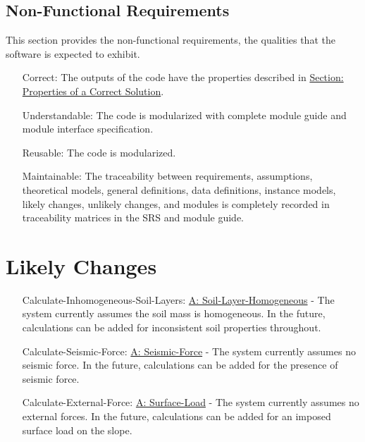 \documentclass[12pt]{article}
\begin{document}
\subsection{Non-Functional Requirements}
\label{Sec:NFRs}
This section provides the non-functional requirements, the qualities that the software is expected to exhibit.
\begin{itemize}
\item[Correct:\phantomsection\label{correct}]The outputs of the code have the properties described in \hyperref[Sec:CorSolProps]{Section: Properties of a Correct Solution}.
\item[Understandable:\phantomsection\label{understandable}]The code is modularized with complete module guide and module interface specification.
\item[Reusable:\phantomsection\label{reusable}]The code is modularized.
\item[Maintainable:\phantomsection\label{maintainable}]The traceability between requirements, assumptions, theoretical models, general definitions, data definitions, instance models, likely changes, unlikely changes, and modules is completely recorded in traceability matrices in the SRS and module guide.
\end{itemize}
\section{Likely Changes}
\label{Sec:LCs}
\begin{itemize}
\item[Calculate-Inhomogeneous-Soil-Layers:\phantomsection\label{LC_inhomogeneous}]\hyperref[assumpSLH]{A: Soil-Layer-Homogeneous} - The system currently assumes the soil mass is homogeneous. In the future, calculations can be added for inconsistent soil properties throughout.
\item[Calculate-Seismic-Force:\phantomsection\label{LC_seismic}]\hyperref[assumpSF]{A: Seismic-Force} - The system currently assumes no seismic force. In the future, calculations can be added for the presence of seismic force.
\item[Calculate-External-Force:\phantomsection\label{LC_external}]\hyperref[assumpSL]{A: Surface-Load} - The system currently assumes no external forces. In the future, calculations can be added for an imposed surface load on the slope.
\end{itemize}
\end{document}
